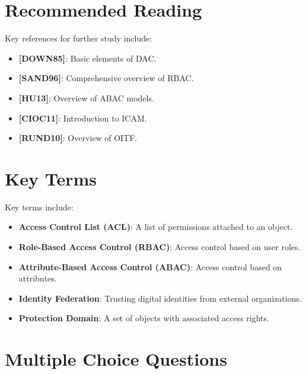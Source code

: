 \documentclass{article}
\begin{document}
\section{Recommended Reading}
Key references for further study include:
\begin{itemize}
    \item \textbf{[DOWN85]}: Basic elements of DAC.
    \item \textbf{[SAND96]}: Comprehensive overview of RBAC.
    \item \textbf{[HU13]}: Overview of ABAC models.
    \item \textbf{[CIOC11]}: Introduction to ICAM.
    \item \textbf{[RUND10]}: Overview of OITF.
\end{itemize}

\section{Key Terms}
Key terms include:
\begin{itemize}
    \item \textbf{Access Control List (ACL)}: A list of permissions attached to an object.
    \item \textbf{Role-Based Access Control (RBAC)}: Access control based on user roles.
    \item \textbf{Attribute-Based Access Control (ABAC)}: Access control based on attributes.
    \item \textbf{Identity Federation}: Trusting digital identities from external organizations.
    \item \textbf{Protection Domain}: A set of objects with associated access rights.
\end{itemize}

\newpage
\section*{Multiple Choice Questions}
\end{document}
